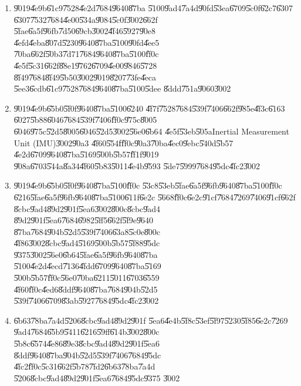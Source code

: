\documentclass[12pt,a4paper]{article}
\begin{document}
\begin{enumerate}
\item \U{9019}\U{4e9b}\U{61c9}\U{7528}\U{4e2d}\U{7684}\U{9640}\U{87ba}%
\U{5100}\U{9ad4}\U{7a4d}\U{90fd}\U{53ea}\U{6709}\U{5c0f}\U{62c7}\U{6307}%
\U{6307}\U{7532}\U{7684}\U{4e00}\U{534a}\U{9084}\U{5c0f}\U{3002}\U{662f}%
\U{5fae}\U{6a5f}\U{96fb}\U{7d50}\U{69cb}\U{3002}\U{4f46}\U{5927}\U{90e8}%
\U{4efd}\U{4eba}\U{807d}\U{5230}\U{9640}\U{87ba}\U{5100}\U{90fd}\U{4ee5}%
\U{70ba}\U{662f}\U{50b3}\U{7d71}\U{7684}\U{9640}\U{87ba}\U{5100}\U{ff0c}%
\U{4e5f}\U{5c31}\U{662f}\U{88e1}\U{9762}\U{6709}\U{4e00}\U{9846}\U{5728}%
\U{8f49}\U{7684}\U{8f49}\U{5b50}\U{3002}\U{9019}\U{8207}\U{73fe}\U{4eca}%
\U{5ee3}\U{6cdb}\U{61c9}\U{7528}\U{7684}\U{9640}\U{87ba}\U{5100}\U{5dee}%
\U{8ddd}\U{751a}\U{9060}\U{3002}

\item \U{9019}\U{4e9b}\U{65b0}\U{5f0f}\U{9640}\U{87ba}\U{5100}\U{6240}%
\U{4f7f}\U{7528}\U{7684}\U{539f}\U{7406}\U{662f}\U{985e}\U{4f3c}\U{6163}%
\U{6027}\U{5b88}\U{6046}\U{7684}\U{539f}\U{7406}\U{ff0c}\U{975c}\U{8005}%
\U{6046}\U{975c}\U{52d5}\U{8005}\U{6046}\U{52d5}\U{3002}\U{56e0}\U{6b64}%
\U{4e5f}\U{53eb}\U{505a}Inertial Measurement Unit (IMU)\U{3002}\U{90a3}%
\U{4f60}\U{554f}\U{ff0c}\U{90a3}\U{70ba}\U{4ec0}\U{9ebc}\U{540d}\U{5b57}%
\U{4e2d}\U{6709}\U{9640}\U{87ba}\U{5169}\U{500b}\U{5b57}\U{ff1f}\U{9019}%
\U{908a}\U{6703}\U{544a}\U{8a34}\U{4f60}\U{5b83}\U{5011}\U{4e4b}\U{9593}%
\U{5de7}\U{5999}\U{7684}\U{95dc}\U{4fc2}\U{3002}

\item \U{9019}\U{4e9b}\U{65b0}\U{5f0f}\U{9640}\U{87ba}\U{5100}\U{ff0c}%
\U{53c8}\U{53eb}\U{5fae}\U{6a5f}\U{96fb}\U{9640}\U{87ba}\U{5100}\U{ff0c}%
\U{6216}\U{5fae}\U{6a5f}\U{96fb}\U{9640}\U{87ba}\U{5100}\U{611f}\U{6e2c}%
\U{5668}\U{ff0c}\U{6e2c}\U{91cf}\U{7684}\U{7269}\U{7406}\U{91cf}\U{662f}%
\U{8cbc}\U{9ad4}\U{89d2}\U{901f}\U{5ea6}\U{3002}\U{800c}\U{8cbc}\U{9ad4}%
\U{89d2}\U{901f}\U{5ea6}\U{7684}\U{6982}\U{5ff5}\U{662f}\U{5f9e}\U{9640}%
\U{87ba}\U{7684}\U{904b}\U{52d5}\U{539f}\U{7406}\U{63a8}\U{5c0e}\U{800c}%
\U{4f86}\U{3002}\U{8cbc}\U{9ad4}\U{5169}\U{500b}\U{5b57}\U{5f88}\U{95dc}%
\U{9375}\U{3002}\U{56e0}\U{6b64}\U{5fae}\U{6a5f}\U{96fb}\U{9640}\U{87ba}%
\U{5100}\U{4e2d}\U{4ecd}\U{7136}\U{4fdd}\U{6709}\U{9640}\U{87ba}\U{5169}%
\U{500b}\U{5b57}\U{ff0c}\U{56e0}\U{70ba}\U{6211}\U{5011}\U{6703}\U{6559}%
\U{4f60}\U{ff0c}\U{4ed6}\U{8ddf}\U{9640}\U{87ba}\U{7684}\U{904b}\U{52d5}%
\U{539f}\U{7406}\U{6709}\U{83ab}\U{5927}\U{7684}\U{95dc}\U{4fc2}\U{3002}

\item \U{6b63}\U{78ba}\U{7a4d}\U{5206}\U{8cbc}\U{9ad4}\U{89d2}\U{901f}%
\U{5ea6}\U{4e4b}\U{5f8c}\U{53ef}\U{5f97}\U{5230}\U{5f85}\U{6e2c}\U{7269}%
\U{9ad4}\U{7684}\U{65b9}\U{5411}\U{6216}\U{59ff}\U{614b}\U{3002}\U{800c}%
\U{5b8c}\U{6574}\U{4e86}\U{89e3}\U{8cbc}\U{9ad4}\U{89d2}\U{901f}\U{5ea6}%
\U{8ddf}\U{9640}\U{87ba}\U{904b}\U{52d5}\U{539f}\U{7406}\U{7684}\U{95dc}%
\U{4fc2}\U{ff0c}\U{5c31}\U{662f}\U{5b78}\U{7fd2}\U{6b63}\U{78ba}\U{7a4d}%
\U{5206}\U{8cbc}\U{9ad4}\U{89d2}\U{901f}\U{5ea6}\U{7684}\U{95dc}\U{9375}%
\U{3002}
\end{enumerate}
\end{document}
